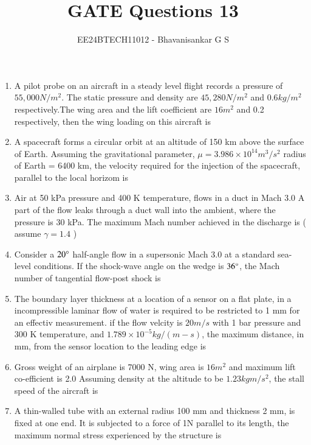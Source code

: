 \documentclass[journal]{IEEEtran}
\begin{document}

\vspace{3cm}

\title{GATE Questions 13}
\author{EE24BTECH11012 - Bhavanisankar G S}
{\let\newpage\relax\maketitle}
\begin{enumerate}
	\item A pilot probe on an aircraft in a steady level flight records a pressure of $55,000 N/m^2$. The static pressure and density are $45,280 N/m^2$ and $0.6 kg/m^2$ respectively.The wing area and the lift coefficient are $16 m^2$ and 0.2 respectively, then the wing loading on this aircraft is
	\item A spacecraft forms a circular orbit at an altitude of 150 km above the surface of Earth. Assuming the gravitational parameter, $\mu = 3.986 \times 10^{14} m^3/s^2$ radius of Earth = 6400 km, the velocity required for the injection of the spacecraft, parallel to the local horizom is
	\item Air at 50 kPa pressure and 400 K temperature, flows in a duct in Mach 3.0 A part of the flow leaks through a duct wall into the ambient, where the pressure is 30 kPa. The maximum Mach number achieved in the discharge is ( assume $\gamma = 1.4$ )
	\item Consider a $20 \degree$ half-angle flow in a supersonic Mach 3.0 at a standard sea-level conditions. If the shock-wave angle on the wedge is $36 \degree$, the Mach number of tangential flow-post shock is
	\item The boundary layer thickness at a location of a sensor on a flat plate, in a incompressible laminar flow of water is required to be restricted to 1 mm for an effectiv measurement. if the flow velcity is $20 m/s$ with 1 bar pressure and 300 K temperature, and $1.789 \times 10^{-5} kg/(m-s)$, the maximum distance, in mm, from the sensor location to the leading edge is
	\item Gross weight of an airplane is 7000 N, wing area is $16 m^2$ and maximum lift co-efficient is 2.0 Assuming density at the altitude to be $1.23 kgm/s^2$, the stall speed of the aircraft is
	\item A thin-walled tube with an external radius 100 mm and thickness 2 mm, is fixed at one end. It is subjected to a force of 1N parallel to its length, the maximum normal stress experienced by the structure is

\end{enumerate}
\end{document}
